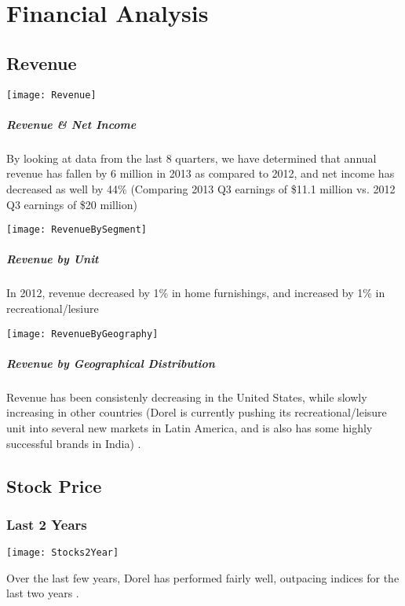 {%
\chapter{Financial Analysis}
\label{chp:financials}
\section{Revenue}
\centerline{\texttt{[image: Revenue]}}
\paragraph{Revenue \& Net Income}By looking at data from the last 8 quarters, we have determined that annual revenue has fallen by 6 million in 2013 as compared to 2012, and net income has decreased as well by 44\% (Comparing 2013 Q3 earnings of \$11.1 million vs. 2012 Q3 earnings of \$20 million) 
\\[1\baselineskip]

\centerline{\texttt{[image: RevenueBySegment]}}
\paragraph{Revenue by Unit}In 2012, revenue decreased by 1\% in home furnishings, and increased by 1\% in recreational/lesiure
\\[1\baselineskip]

\centerline{\texttt{[image: RevenueByGeography]}}
\paragraph{Revenue by Geographical Distribution}Revenue has been consistenly decreasing in the United States, while slowly increasing in other countries (Dorel is currently pushing its recreational/leisure unit into several new markets in Latin America, and is also has some highly successful brands in India) \cite{BRAINStaff2013}.

\section {Stock Price}
\subsection{Last 2 Years}
\centerline{\texttt{[image: Stocks2Year]}}
Over the last few years, Dorel has performed fairly well, outpacing indices for the last two years \cite{YahooFinance2014}.

}
